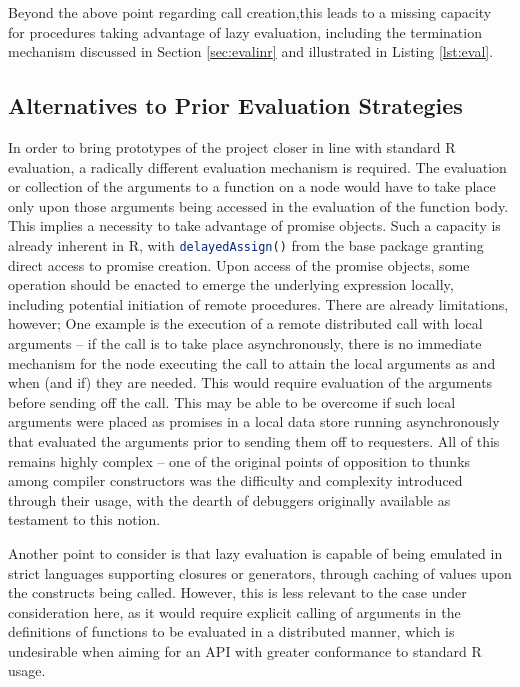Beyond the above point regarding call creation,this leads to a missing capacity for procedures taking advantage of lazy evaluation, including the termination mechanism discussed in Section \cref{sec:evalinr} and illustrated in Listing \cref{lst:eval}.

\subsection{Alternatives to Prior Evaluation Strategies}

In order to bring prototypes of the project closer in line with standard R evaluation, a radically different evaluation mechanism is required.
The evaluation or collection of the arguments to a function on a node would have to take place only upon those arguments being accessed in the evaluation of the function body.
This implies a necessity to take advantage of promise objects.
Such a capacity is already inherent in R, with \lstinline[language=R]{delayedAssign()} from the base package granting direct access to promise creation.
Upon access of the promise objects, some operation should be enacted to emerge the underlying expression locally, including potential initiation of remote procedures.
There are already limitations, however;
One example is the execution of a remote distributed call with local arguments -- if the call is to take place asynchronously, there is no immediate mechanism for the node executing the call to attain the local arguments as and when (and if) they are needed.
This would require evaluation of the arguments before sending off the call.
This may be able to be overcome if such local arguments were placed as promises in a local data store running asynchronously that evaluated the arguments prior to sending them off to requesters.
All of this remains highly complex -- one of the original points of opposition to thunks \cite{ingerman1961thunks}among compiler constructors was the difficulty and complexity introduced through their usage, with the dearth of debuggers originally available as testament to this notion.

Another point to consider is that lazy evaluation is capable of being emulated in strict languages supporting closures or generators, through caching of values upon the constructs being called.
However, this is less relevant to the case under consideration here, as it would require explicit calling of arguments in the definitions of functions to be evaluated in a distributed manner, which is undesirable when aiming for an API with greater conformance to standard R usage.

